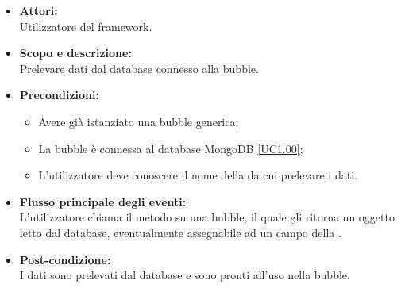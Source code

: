 \begin{itemize}
	\item \textbf{Attori:}
	\\Utilizzatore del framework.
	\item \textbf{Scopo e descrizione:} 
	\\Prelevare dati dal database connesso alla bubble.
	\item \textbf{Precondizioni:}
	\begin{itemize}
		\item Avere già istanziato una bubble generica;
		\item La bubble è connessa al database MongoDB \ref{UC1.00};
		\item L'utilizzatore deve conoscere il nome della  da cui prelevare i dati.
	\end{itemize}
	\item \textbf{Flusso principale degli eventi:}
	\\L'utilizzatore chiama il metodo su una bubble, il quale gli ritorna un oggetto  letto dal database, eventualmente assegnabile ad un campo della .
	\item \textbf{Post-condizione:}
	\\I dati sono prelevati dal database e sono pronti all'uso nella bubble.
\end{itemize}

